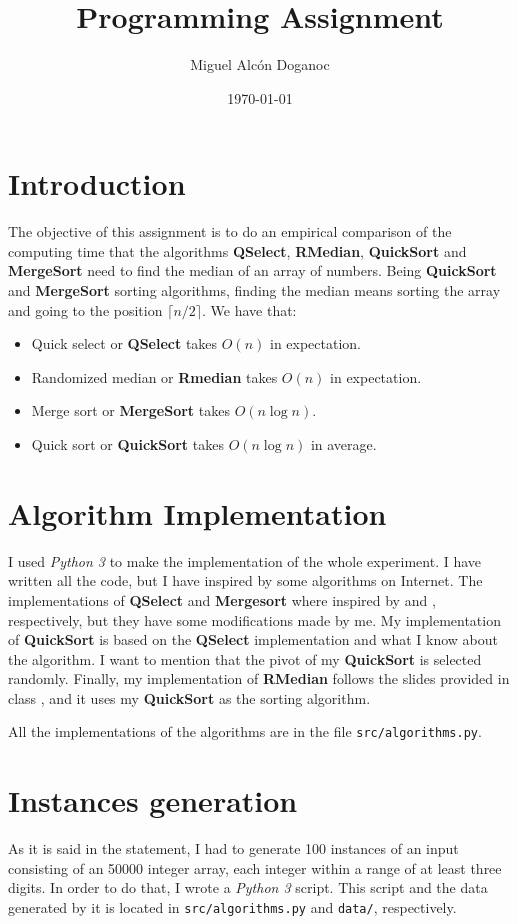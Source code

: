 \documentclass[letterpaper,12pt]{article}
\newcommand{\code}[1]{\texttt{#1}}
\begin{document}
\title{Programming Assignment}
\author{Miguel Alcón Doganoc}
\date{\today}
\maketitle

\section{Introduction}
The objective of this assignment is to do an empirical comparison of the computing time that the algorithms \textbf{QSelect}, \textbf{RMedian}, \textbf{QuickSort} and \textbf{MergeSort} need to find the median of an array of numbers. Being \textbf{QuickSort} and \textbf{MergeSort} sorting algorithms, finding the median means sorting the array and going to the position $\lceil n/2 \rceil $. We have that:
\begin{itemize}
    \item Quick select or \textbf{QSelect} takes $O(n)$ in expectation.
    \item Randomized median or \textbf{Rmedian} takes $O(n)$ in expectation.
    \item Merge sort or \textbf{MergeSort} takes $O(n \log n)$.
    \item Quick sort or \textbf{QuickSort} takes $O(n \log n)$ in average.
\end{itemize}

\section{Algorithm Implementation}
I used \textit{Python 3} to make the implementation of the whole experiment. I have written all the code, but I have inspired by some algorithms on Internet. The implementations of \textbf{QSelect} and \textbf{Mergesort} where inspired by \cite{qselect} and \cite{mergesort}, respectively, but they have some modifications made by me. My implementation of \textbf{QuickSort} is based on the \textbf{QSelect} implementation and what I know about the algorithm. I want to mention that the pivot of my \textbf{QuickSort} is selected randomly. Finally, my implementation of \textbf{RMedian} follows the slides provided in class \cite{slides}, and it uses my \textbf{QuickSort} as the sorting algorithm.

All the implementations of the algorithms are in the file \code{src/algorithms.py}.

\section{Instances generation}
As it is said in the statement, I had to generate 100 instances of an input consisting of an 50000 integer array, each integer within a range of at least three digits. In order to do that, I wrote a \textit{Python 3} script. This script and the data generated by it is located in \code{src/algorithms.py} and \code{data/}, respectively. \\
\end{document}
